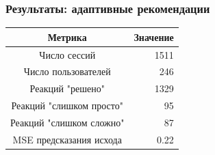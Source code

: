 \documentclass{beamer}
\begin{document}
\begin{frame}\frametitle{Результаты: адаптивные рекомендации}

\begin{table}[H]
    \begin{tabular}{| c || r| }
      Метрика & Значение \\
      \hline		
      Число сессий & 1511 \\
      Число пользователей & 246 \\
      Реакций "решено" & 1329 \\
      Реакций "слишком просто" & 95 \\ 
      Реакций "слишком сложно" & 87 \\
      MSE предсказания исхода & 0.22 \\
      
     \hline  
    \end{tabular}
\end{table}



\begin{figure}[H]
  \centering
  \hfill
\end{figure}

\end{frame}
\end{document}
